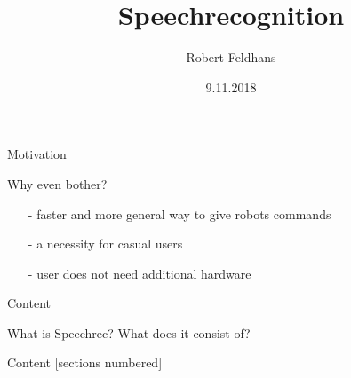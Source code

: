 \documentclass{beamer}
\title{Speechrecognition}
\date{9.11.2018}
\author{Robert Feldhans}
\institute{Seminar Robocup}
\begin{document}
	\maketitle
	
	\begin{frame}{Motivation}
		\begin{alertblock}{Why even bother?}
			\begin{itemize}
				\item[-] faster and more general way to give robots commands
				\item[-] a necessity for casual users
				\item[-] user does not need additional hardware
			\end{itemize}
		\end{alertblock}
	\end{frame}
	
	\begin{frame}{Content}
		
		\begin{alertblock}{What is Speechrec? What does it consist of?}
		\end{alertblock}
		
	\end{frame}
	
	\begin{frame}{Content}
		[sections numbered]
		\tableofcontents[hideallsubsections]
	\end{frame}
	
\end{document}
